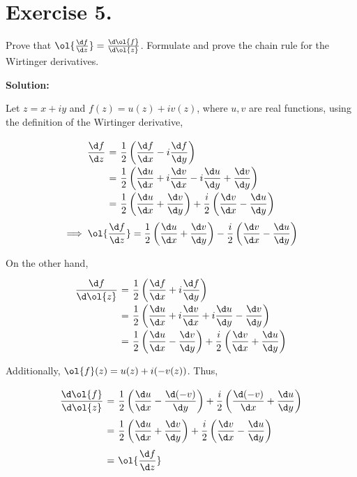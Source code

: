 \section*{Exercise 5.}

Prove that $\ol{\frac{\d f}{\d z}} = \frac{\d \ol{f}}{\d \ol{z}}$. Formulate and prove the chain rule for the Wirtinger derivatives.

\textbf{Solution:}

Let $z = x + i y$ and $f(z) = u(z) + i v(z)$, where $u,v$ are real functions, using the definition of the Wirtinger derivative,

\[ \everymath{\displaystyle}
\arraycolsep=1.8pt\def\arraystretch{2}
\begin{array}{rcl}
    \frac{\d f}{\d z} & = & \frac{1}{2} \left( \frac{\d f}{\d x} - i \frac{\d f}{\d y} \right)\\
    & = & \frac{1}{2} \left( \frac{\d u}{\d x} + i \frac{\d v}{\d x} - i \frac{\d u}{\d y} + \frac{\d v}{\d y} \right)\\
    & = & \frac{1}{2} \left( \frac{\d u}{\d x} + \frac{\d v}{\d y} \right) + \frac{i}{2} \left( \frac{\d v}{\d x} - \frac{\d u}{\d y} \right)
\end{array} \]
\[ \implies \ol{\frac{\d f}{\d z}} = \frac{1}{2} \left( \frac{\d u}{\d x} + \frac{\d v}{\d y} \right) - \frac{i}{2} \left( \frac{\d v}{\d x} - \frac{\d u}{\d y} \right) \]

On the other hand, 
\[ \everymath{\displaystyle}
\arraycolsep=1.8pt\def\arraystretch{2}
\begin{array}{rcl}
    \frac{\d f}{\d \ol{z}} & = & \frac{1}{2} \left( \frac{\d f}{\d x} + i \frac{\d f}{\d y} \right)\\
    & = & \frac{1}{2} \left( \frac{\d u}{\d x} + i \frac{\d v}{\d x} + i \frac{\d u}{\d y} - \frac{\d v}{\d y} \right)\\
    & = & \frac{1}{2} \left( \frac{\d u}{\d x} - \frac{\d v}{\d y} \right) + \frac{i}{2} \left( \frac{\d v}{\d x} + \frac{\d u}{\d y} \right)
\end{array} \]

Additionally, $\ol{f}(z) = u(z)+i(-v(z))$. Thus,
\[ \everymath{\displaystyle}
\arraycolsep=1.8pt\def\arraystretch{2.5}
\begin{array}{rcl}
    \frac{\d \ol{f}}{\d \ol{z}} & = & \frac{1}{2} \left( \frac{\d u}{\d x} - \frac{\d (-v)}{\d y} \right) + \frac{i}{2} \left( \frac{\d (-v)}{\d x} + \frac{\d u}{\d y} \right) \\
    & = & \frac{1}{2} \left( \frac{\d u}{\d x} + \frac{\d v}{\d y} \right) + \frac{i}{2} \left( \frac{\d v}{\d x} - \frac{\d u}{\d y} \right)\\
    & = & \ol{\frac{\d f}{\d z}}
\end{array}\]

